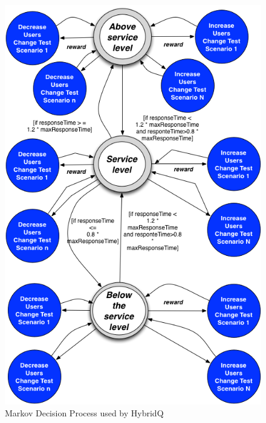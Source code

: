 \begin{figure}[h!]
\begin{minipage}{.5\textwidth}
\center
\includegraphics[width=1\textwidth]{./images/mdp3.png}
\caption{Markov Decision Process used by HybridQ}
\label{fig:mdphybridq}
\end{minipage}
\begin{minipage}{.5\textwidth}
\center

\end{minipage}
\end{figure}
